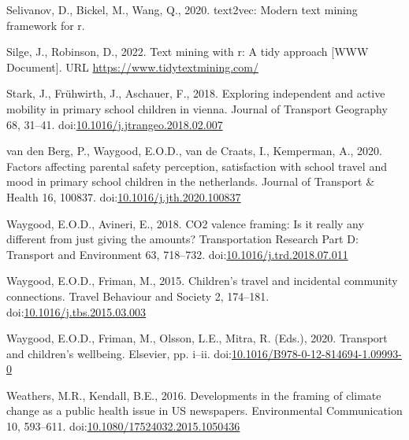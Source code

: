 \documentclass[]{elsarticle} %
\newlength{\cslhangindent}
\newlength{\cslentryspacingunit} %
\newenvironment{CSLReferences}[2] %
 {%
  \setlength{\parindent}{0pt}
  \ifodd #1
  \let\oldpar\par
  \def\par{\hangindent=\cslhangindent\oldpar}
  \fi
  \setlength{\parskip}{#2\cslentryspacingunit}
 }%
 {}
\begin{document}
\begin{CSLReferences}{1}{0}
\leavevmode{}%
Selivanov, D., Bickel, M., Wang, Q., 2020. text2vec: Modern text mining
framework for r.

\leavevmode{}%
Silge, J., Robinson, D., 2022. Text mining with r: A tidy approach
{[}WWW Document{]}. URL \url{https://www.tidytextmining.com/}

\leavevmode{}%
Stark, J., Frühwirth, J., Aschauer, F., 2018. Exploring independent and
active mobility in primary school children in vienna. Journal of
Transport Geography 68, 31--41.
doi:\href{https://doi.org/10.1016/j.jtrangeo.2018.02.007}{10.1016/j.jtrangeo.2018.02.007}

\leavevmode{}%
van den Berg, P., Waygood, E.O.D., van de Craats, I., Kemperman, A.,
2020. Factors affecting parental safety perception, satisfaction with
school travel and mood in primary school children in the netherlands.
Journal of Transport \& Health 16, 100837.
doi:\href{https://doi.org/10.1016/j.jth.2020.100837}{10.1016/j.jth.2020.100837}

\leavevmode{}%
Waygood, E.O.D., Avineri, E., 2018. CO2 valence framing: Is it really
any different from just giving the amounts? Transportation Research Part
D: Transport and Environment 63, 718--732.
doi:\href{https://doi.org/10.1016/j.trd.2018.07.011}{10.1016/j.trd.2018.07.011}

\leavevmode{}%
Waygood, E.O.D., Friman, M., 2015. Children's travel and incidental
community connections. Travel Behaviour and Society 2, 174--181.
doi:\href{https://doi.org/10.1016/j.tbs.2015.03.003}{10.1016/j.tbs.2015.03.003}

\leavevmode{}%
Waygood, E.O.D., Friman, M., Olsson, L.E., Mitra, R. (Eds.), 2020.
Transport and children's wellbeing. {Elsevier}, pp. i--ii.
doi:\href{https://doi.org/10.1016/B978-0-12-814694-1.09993-0}{10.1016/B978-0-12-814694-1.09993-0}

\leavevmode{}%
Weathers, M.R., Kendall, B.E., 2016. Developments in the framing of
climate change as a public health issue in US newspapers. Environmental
Communication 10, 593--611.
doi:\href{https://doi.org/10.1080/17524032.2015.1050436}{10.1080/17524032.2015.1050436}


\end{CSLReferences}
\end{document}
